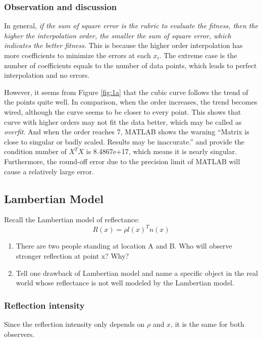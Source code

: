 \subsubsection{Observation and discussion}
In general, \emph{if the sum of square error is the rubric to evaluate the fitness, then the higher the interpolation order, the smaller the sum of square error, which indicates the better fitness.}
This is because the higher order interpolation has more coefficients to minimize the errors at each \(x_i\).
The extreme case is the number of coefficients equals to the number of data points, which leads to perfect interpolation and no errors.

However, it seems from Figure \ref{fig:1a} that the cubic curve follows the trend of the points quite well.
In comparison, when the order increases, the trend becomes wired, although the curve seems to be closer to every point.
This shows that curve with higher orders may not fit the data better, which may be called as \emph{overfit}.
And when the order reaches 7, MATLAB shows the warning ``Matrix is close to singular or badly scaled. Results may be inaccurate.'' and provide the condition number of \(X^T X\) is 8.4867e+17, which means it is nearly singular.
Furthermore, the round-off error due to the precision limit of MATLAB will cause a relatively large error.



\subsection{Lambertian Model}
Recall the Lambertian model of reflectance:
\begin{equation}\label{lambertian}
R(x) = \rho l(x)^T n(x)
\end{equation}
\begin{enumerate}
	\item There are two people standing at location A and B.
	Who will observe stronger reflection at point x? Why?
	\item Tell one drawback of Lambertian model and name a specific object in the real world whose reflectance is not well modeled by the Lambertian model.
\end{enumerate}

\subsubsection{Reflection intensity}
Since the reflection intensity only depends on \(\rho\) and \(x\), it is the same for both observers.

